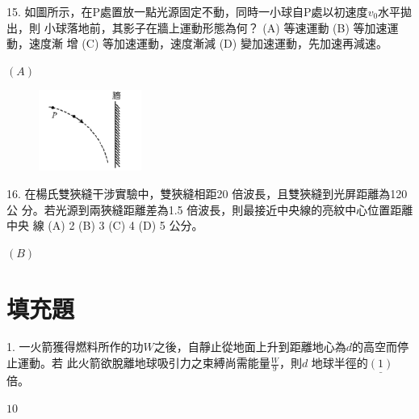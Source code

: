 \documentclass[cn,10pt,math=newtx,chinesefont=founder,device=ig]{elegantbook}
\begin{document}
\begin{example}
   15. 如圖所示，在P處置放一點光源固定不動，同時一小球自P處以初速度$v_0$水平拋出，則
小球落地前，其影子在牆上運動形態為何？ (A) 等速運動 (B) 等加速運動，速度漸
增 (C) 等加速運動，速度漸減 (D) 變加速運動，先加速再減速。\\
    \rightline{[全國聯招教甄109]}
\end{example}
\begin{solution}
    $(A)$
\end{solution}
\begin{figure}[htbp]
    \flushright
    \includegraphics[width=0.3\textwidth]{image/109全國15.png}
  \end{figure}
\newpage



\begin{example}
   16. 在楊氏雙狹縫干涉實驗中，雙狹縫相距20 倍波長，且雙狹縫到光屏距離為120 公
分。若光源到兩狹縫距離差為1.5 倍波長，則最接近中央線的亮紋中心位置距離中央
線 (A) 2 (B) 3 (C) 4 (D) 5 公分。\\
    \rightline{[全國聯招教甄109]}
\end{example}
\begin{solution}
    $(B)$
\end{solution}

\newpage

\section{填充題}


\begin{example}
   1. 一火箭獲得燃料所作的功$W$之後，自靜止從地面上升到距離地心為$d$的高空而停止運動。若
此火箭欲脫離地球吸引力之束縛尚需能量$\frac{W}{9}$，則$d$ 地球半徑的$\underline{(1)}$倍。\\
    \rightline{[全國聯招教甄109]}
\end{example}
\begin{solution}
    $10$
\end{solution}

\newpage
\end{document}
